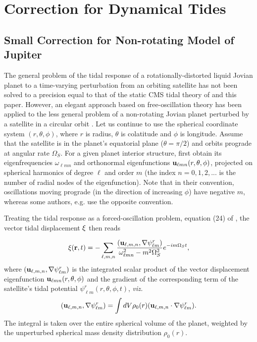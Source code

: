 \section{Correction for Dynamical Tides}

\subsection{Small Correction for Non-rotating Model of Jupiter}

The general problem of the tidal response of a rotationally-distorted liquid
Jovian planet to a time-varying perturbation from an orbiting satellite
has not been solved to a precision equal to that of the static CMS tidal
theory of \citet{wahl2016} and this paper.  However, an elegant approach
based on free-oscillation theory has been applied to the less general problem
of a non-rotating Jovian planet perturbed by a satellite in a circular orbit
\citep{vorontsov1984}.  Let us continue to use the spherical coordinate system $(r,\theta,\phi)$,
where $r$ is radius, $\theta$ is colatitude and $\phi$ is longitude.
Assume that the satellite is in the planet's equatorial
plane ($\theta=\pi/2$) and orbits prograde at angular rate $\Omega_S$.  For a given planet
interior structure, \citet{vorontsov1984} first obtain its eigenfrequencies
$\omega_{\ell m n}$ and orthonormal
eigenfunctions ${\bf u}_{\ell m n}(r,\theta,\phi)$, projected on spherical harmonics
of degree $\ell$ and order $m$ (the index $n=0,1,2,...$ is the number of radial nodes
of the eigenfunction).  Note that in their convention, oscillations moving prograde
(in the direction of increasing $\phi$) have negative $m$, whereas some authors, e.g.
\citet{marley1993} use the opposite convention.

Treating the tidal response as a forced-oscillation problem, equation (24) of
\citet{vorontsov1984}, the vector tidal displacement ${\bf \xi}$ then reads

\begin{equation}
    {\bf \xi}({\bf r},t) = -\sum_{\ell,m,n} {{({\bf u}_{\ell,m,n},{\bf \nabla}\psi^r_{\ell m})}
\over {\omega^2_{\ell m n} - m^2 \Omega_S^2}} e^{-i m \Omega_S t},
\label{eq:xioft}
\end{equation}
where $({\bf u}_{\ell,m,n},{\bf \nabla} \psi^r_{\ell m})$ is the integrated scalar product of the
vector displacement eigenfunction ${\bf u}_{\ell m n}(r,\theta,\phi)$ and the
gradient of the corresponding term of the satellite's tidal potential
$\psi^r_{\ell m}(r,\theta,\phi,t)$, {\it viz.}
\begin{equation}
    ({\bf u}_{\ell,m,n},{\bf \nabla} \psi^r_{\ell m})=
\int dV \rho_0(r) ({\bf u}_{\ell,m,n} \cdot {\bf \nabla} \psi^r_{\ell m}).
\label{eq:scalprod}
\end{equation}
The integral is taken over the entire spherical volume of the planet,
weighted by the unperturbed spherical mass density distribution $\rho_0(r)$.

